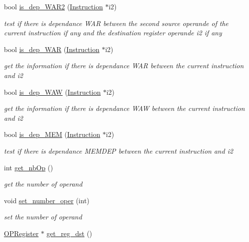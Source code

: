 \begin{DoxyCompactItemize}
bool \hyperlink{class_instruction_a04471df677984f67ec13de88f55e3703}{is\+\_\+dep\+\_\+\+W\+A\+R2} (\hyperlink{class_instruction}{Instruction} $\ast$i2)
\begin{DoxyCompactList}\small\item\em test if there is dependance W\+A\+R between the second source operande of the current instruction if any and the destination register operande i2 if any \end{DoxyCompactList}\item 
bool \hyperlink{class_instruction_ae79b239c6ab30a15064b5a00944ad65a}{is\+\_\+dep\+\_\+\+W\+A\+R} (\hyperlink{class_instruction}{Instruction} $\ast$i2)
\begin{DoxyCompactList}\small\item\em get the information if there is dependance W\+A\+R between the current instruction and i2 \end{DoxyCompactList}\item 
bool \hyperlink{class_instruction_a30c159faa5c462bb2c7ae7562c9c8254}{is\+\_\+dep\+\_\+\+W\+A\+W} (\hyperlink{class_instruction}{Instruction} $\ast$i2)
\begin{DoxyCompactList}\small\item\em get the information if there is dependance W\+A\+W between the current instruction and i2 \end{DoxyCompactList}\item 
bool \hyperlink{class_instruction_a28526bda91b964d7fd81f85cee02c624}{is\+\_\+dep\+\_\+\+M\+E\+M} (\hyperlink{class_instruction}{Instruction} $\ast$i2)
\begin{DoxyCompactList}\small\item\em test if there is dependance M\+E\+M\+D\+E\+P between the current instruction and i2 \end{DoxyCompactList}\item 
int \hyperlink{class_instruction_a044a281355f25375a7765f24bdf614f3}{get\+\_\+nb\+Op} ()
\begin{DoxyCompactList}\small\item\em get the number of operand \end{DoxyCompactList}\item 
\hypertarget{class_instruction_a6ff2d531dffa43d3db22194459336d33}{void \hyperlink{class_instruction_a6ff2d531dffa43d3db22194459336d33}{set\+\_\+number\+\_\+oper} (int)}\label{class_instruction_a6ff2d531dffa43d3db22194459336d33}

\begin{DoxyCompactList}\small\item\em set the number of operand \end{DoxyCompactList}\item 
\hypertarget{class_instruction_adb43e7019987daebb3970335aba695cc}{\hyperlink{class_o_p_register}{O\+P\+Register} $\ast$ \hyperlink{class_instruction_adb43e7019987daebb3970335aba695cc}{get\+\_\+reg\+\_\+dst} ()}\label{class_instruction_adb43e7019987daebb3970335aba695cc}


\end{DoxyCompactItemize}
